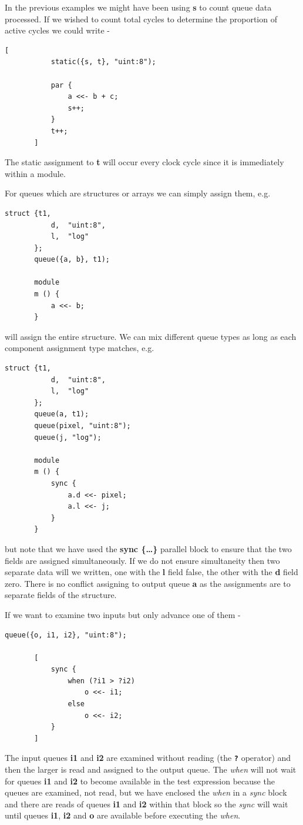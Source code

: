     In the previous examples we might have been using {\bf s} to
    count queue data processed. If we wished to count total cycles
    to determine the proportion of active cycles we could write -
    \begin{lstlisting}[gobble=4, language=threepl]
       [
           static({s, t}, "uint:8");

           par {
               a <<- b + c;
               s++;
           }
           t++;
       ]
    \end{lstlisting}
    The static assignment to {\bf t} will occur every clock cycle
    since it is immediately within a module.

    For queues which are structures or arrays we can
    simply assign them, e.g.
    \begin{lstlisting}[gobble=4, language=threepl]
       struct {t1,
           d,  "uint:8",
           l,  "log"
       };
       queue({a, b}, t1);

       module
       m () {
           a <<- b;
       }
    \end{lstlisting}
    will assign the entire structure. We
    can mix different queue types as long as each component assignment
    type matches, e.g.
    \begin{lstlisting}[gobble=4, language=threepl]
       struct {t1,
           d,  "uint:8",
           l,  "log"
       };
       queue(a, t1);
       queue(pixel, "uint:8");
       queue(j, "log");

       module
       m () {
           sync {
               a.d <<- pixel;
               a.l <<- j;
           }
       }
    \end{lstlisting}
    but note that we have used the {\bf sync \{\dots\}} parallel
    block to ensure that the two fields are assigned simultaneously.
    If we do not ensure simultaneity then two separate data will
    we written, one with the {\bf l} field false, the other with
    the {\bf d} field zero. There is no conflict assigning to
    output queue {\bf a} as the assignments are to separate
    fields of the structure.

    If we want to examine two inputs but only advance one
    of them -
    \begin{lstlisting}[gobble=4, language=threepl]
       queue({o, i1, i2}, "uint:8");

       [
           sync {
               when (?i1 > ?i2)
                   o <<- i1;
               else
                   o <<- i2;
           }
       ]
    \end{lstlisting}
    The input queues {\bf i1} and {\bf i2} are examined
    without reading (the {\bf \verb'?'} operator) and then
    the larger is read and assigned to the output queue.
    The {\em when} will not wait for queues {\bf i1} and {\bf i2} to 
    become available in the test expression because the queues are examined,
    not read, but we have enclosed the {\em when} in a {\em sync} block
    and there are reads of queues {\bf i1} and {\bf i2} within that block so
    the {\em sync} will wait until queues {\bf i1}, {\bf i2} and {\bf o} are
    available before executing the {\em when}.

